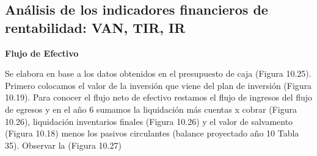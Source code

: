 \subsection{Análisis de los indicadores financieros de rentabilidad: VAN, TIR, IR}

\textbf{Flujo de Efectivo}

Se elabora en base a los datos obtenidos en el presupuesto de caja (Figura 10.25). Primero colocamos el valor de la inversión que viene del plan de inversión (Figura 10.19). Para conocer el flujo neto de efectivo restamos el flujo de ingresos del flujo de egresos y en el año 6 sumamos la liquidación más cuentas x cobrar (Figura 10.26), liquidación inventarios finales (Figura 10.26) y el valor de salvamento (Figura 10.18) menos los pasivos circulantes (balance proyectado año 10 Tabla 35). Observar la (Figura 10.27)

